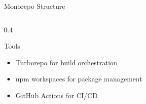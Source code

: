 \documentclass[10pt,aspectratio=169,t]{beamer}
\begin{document}
\begin{frame}{Monorepo Structure}
\begin{columns}
\begin{column}{0.4\paperwidth}
      \begin{block}{Tools}
        \begin{itemize}
          \item Turborepo for build orchestration
          \item npm workspaces for package management
          \item GitHub Actions for CI/CD
        \end{itemize}
      \end{block}

    \end{column}

  \end{columns}

\end{frame}

\end{document}
